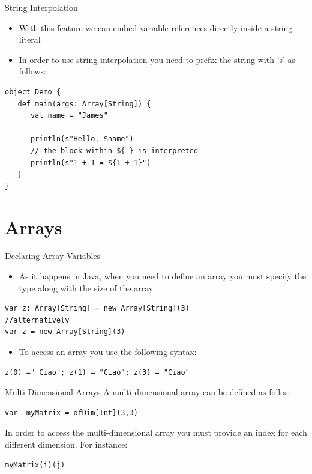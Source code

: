 \documentclass[presentation, aspectratio=169]{beamer}
\begin{document}
\begin{frame}[label={sec:orgfc51d06},fragile]{String Interpolation}
 \begin{itemize}
\item With this feature we can embed variable references directly inside a string literal
\item In order to use string interpolation you need to prefix the string with 's' as follows:
\end{itemize}
\begin{verbatim}
object Demo {
   def main(args: Array[String]) {
      val name = "James"

      println(s"Hello, $name")
      // the block within ${ } is interpreted
      println(s"1 + 1 = ${1 + 1}")
   }
}
\end{verbatim}
\end{frame}

\section{Arrays}
\label{sec:org180924a}

\begin{frame}[label={sec:org5fca719},fragile]{Declaring Array Variables}
 \begin{itemize}
\item As it happens in Java, when you need to define an array you must specify the type 
along with the size of the array
\end{itemize}
\begin{verbatim}
var z: Array[String] = new Array[String](3)
//alternatively
var z = new Array[String](3)
\end{verbatim}
\begin{itemize}
\item To access an array you use the following syntax:
\end{itemize}
\begin{verbatim}
z(0) =" Ciao"; z(1) = "Ciao"; z(3) = "Ciao"
\end{verbatim}
\end{frame}

\begin{frame}[label={sec:orgb397b35},fragile]{Multi-Dimensional Arrays}
 A multi-dimensional array can be defined as follos:
\begin{verbatim}
var  myMatrix = ofDim[Int](3,3)
\end{verbatim}

In order to access the multi-dimensional array you must provide 
an index for each different dimension. For instance:
\begin{verbatim}
myMatrix(i)(j)
\end{verbatim}
\end{frame}
\end{document}
